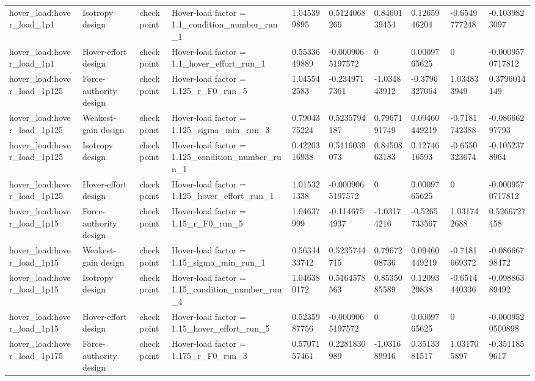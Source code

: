 \begin{tabular}{@{}llllllllll@{}}
hover\_load:hover\_load\_1p1 & Isotropy design & checkpoint & Hover-load factor = 1.1\_condition\_number\_run\_1 & 1.045399895 & 0.5124068266 & 0.8460139454 & 0.1265946204 & -0.6549777248 & -0.1039823097 \\
hover\_load:hover\_load\_1p1 & Hover-effort design & checkpoint & Hover-load factor = 1.1\_hover\_effort\_run\_1 & 0.5533649889 & -0.0009065197572 & 0 & 0.0009765625 & 0 & -0.0009570717812 \\
hover\_load:hover\_load\_1p125 & Force-authority design & checkpoint & Hover-load factor = 1.125\_r\_F0\_run\_5 & 1.045542583 & -0.2349717361 & -1.034843912 & -0.3796327064 & 1.034833949 & 0.3796014149 \\
hover\_load:hover\_load\_1p125 & Weakest-gain design & checkpoint & Hover-load factor = 1.125\_sigma\_min\_run\_3 & 0.7904375224 & 0.5235794187 & 0.7967191749 & 0.09460449219 & -0.7181742388 & -0.08666297793 \\
hover\_load:hover\_load\_1p125 & Isotropy design & checkpoint & Hover-load factor = 1.125\_condition\_number\_run\_1 & 0.4220316938 & 0.5116039073 & 0.8450863183 & 0.1274616593 & -0.6550323674 & -0.1052378964 \\
hover\_load:hover\_load\_1p125 & Hover-effort design & checkpoint & Hover-load factor = 1.125\_hover\_effort\_run\_1 & 1.015321338 & -0.0009065197572 & 0 & 0.0009765625 & 0 & -0.0009570717812 \\
hover\_load:hover\_load\_1p15 & Force-authority design & checkpoint & Hover-load factor = 1.15\_r\_F0\_run\_5 & 1.04637999 & -0.1146754937 & -1.03174216 & -0.5265733567 & 1.031742688 & 0.5266727458 \\
hover\_load:hover\_load\_1p15 & Weakest-gain design & checkpoint & Hover-load factor = 1.15\_sigma\_min\_run\_1 & 0.5634433742 & 0.5235744715 & 0.7967208736 & 0.09460449219 & -0.7181669372 & -0.08666798472 \\
hover\_load:hover\_load\_1p15 & Isotropy design & checkpoint & Hover-load factor = 1.15\_condition\_number\_run\_4 & 1.046380172 & 0.5164578563 & 0.8535085589 & 0.1209329838 & -0.6514440336 & -0.09886389492 \\
hover\_load:hover\_load\_1p15 & Hover-effort design & checkpoint & Hover-load factor = 1.15\_hover\_effort\_run\_5 & 0.5235987756 & -0.0009065197572 & 0 & 0.0009765625 & 0 & -0.0009520500898 \\
hover\_load:hover\_load\_1p175 & Force-authority design & checkpoint & Hover-load factor = 1.175\_r\_F0\_run\_3 & 0.5707157461 & 0.2281830989 & -1.031689916 & 0.3513381517 & 1.031705897 & -0.3511859617 \\

\end{tabular}
